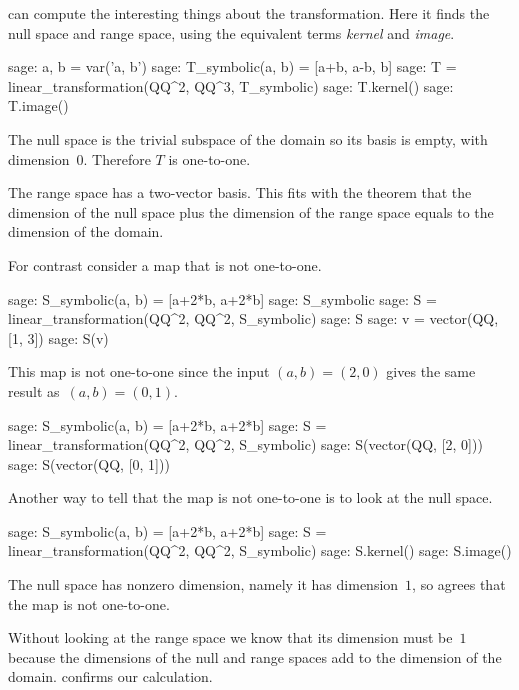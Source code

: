 \Sage{} can compute the interesting things about the transformation.
Here it finds the null space 
and range space, using the equivalent 
terms \textit{kernel} and \textit{image}.
\begin{sagecommandline}
sage: a, b = var('a, b')   
sage: T_symbolic(a, b) = [a+b, a-b, b]         
sage: T = linear_transformation(QQ^2, QQ^3, T_symbolic)
sage: T.kernel()                                       
sage: T.image()                                        
\end{sagecommandline}
The null space is the trivial subspace of the domain so
its basis is empty,
with dimension~$0$.
Therefore $T$ is one-to-one.

The range space has a two-vector basis. 
This fits with the theorem that
the dimension of the null space plus the dimension of the 
range space equals to the dimension of the domain.

For contrast consider a map that is not one-to-one.
\begin{sagecommandline}
sage: S_symbolic(a, b) = [a+2*b, a+2*b]
sage: S_symbolic
sage: S = linear_transformation(QQ^2, QQ^2, S_symbolic)
sage: S
sage: v = vector(QQ, [1, 3])  
sage: S(v)
\end{sagecommandline}
\noindent This map is not one-to-one since the input $(a,b)=(2,0)$  gives
the same result as~$(a,b)=(0,1)$.  
\begin{sagecommandline}
sage: S_symbolic(a, b) = [a+2*b, a+2*b]
sage: S = linear_transformation(QQ^2, QQ^2, S_symbolic)
sage: S(vector(QQ, [2, 0]))
sage: S(vector(QQ, [0, 1]))
\end{sagecommandline}
\noindent
Another way to tell that the map is not one-to-one is to look at the 
null space.
\begin{sagecommandline}
sage: S_symbolic(a, b) = [a+2*b, a+2*b]
sage: S = linear_transformation(QQ^2, QQ^2, S_symbolic)
sage: S.kernel()
sage: S.image()
\end{sagecommandline}
The null space has nonzero dimension, namely it 
has dimension~$1$,
so \Sage{} agrees that the map is not one-to-one.

Without looking at the range space we know that its dimension must be~$1$ 
because the dimensions of the null and range spaces add to
the dimension of the domain.
\Sage{} confirms our calculation.



